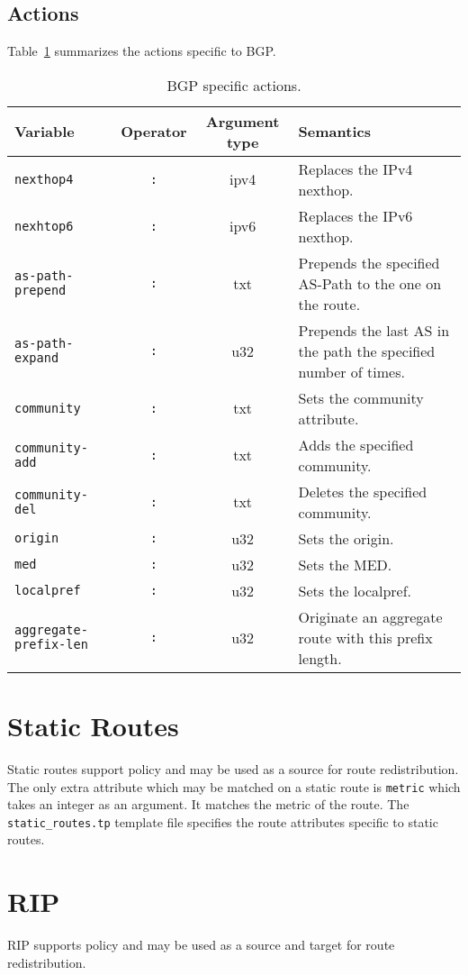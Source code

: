 \subsection{Actions}
Table~\ref{policy_bgp_action} summarizes the actions specific to BGP.
\begin{table}[h]
\centering
\begin{tabular}{|l|c|c|p{7cm}|}
\hline
Variable & Operator & Argument type & Semantics \\
\hline\hline
{\tt nexthop4} & {\tt :} & ipv4 & Replaces the IPv4 nexthop. \\
{\tt nexhtop6} & {\tt :} & ipv6 & Replaces the IPv6 nexthop. \\
\hline
{\tt as-path-prepend} & {\tt :} & txt & Prepends the specified AS-Path to the
one on the route. \\
{\tt as-path-expand} & {\tt :} & u32 & Prepends the last AS in the path the
specified number of times. \\
\hline
{\tt community} & {\tt :} & txt &  Sets the community attribute.\\
{\tt community-add} & {\tt :} & txt & Adds the specified community. \\
\hline
{\tt community-del} & {\tt :} & txt & Deletes the specified community. \\
\hline
{\tt origin} & {\tt :} & u32 & Sets the origin. \\
\hline
{\tt med} & {\tt :} & u32 & Sets the MED. \\
\hline
{\tt localpref} & {\tt :} & u32 & Sets the localpref. \\
\hline
{\tt aggregate-prefix-len} & {\tt :} & u32 & Originate an aggregate route with
this prefix length. \\
\hline
\end{tabular}
\caption{\label{policy_bgp_action}BGP specific actions.}
\end{table}

\section{Static Routes}
Static routes support policy and may be used as a source for route
redistribution.  The only extra attribute which may be matched on a static route
is {\tt metric} which takes an integer as an argument.  It matches the metric of
the route.  The {\tt static\_routes.tp} template file specifies the route
attributes specific to static routes.

\section{RIP}
RIP supports policy and may be used as a source and target for route
redistribution.

